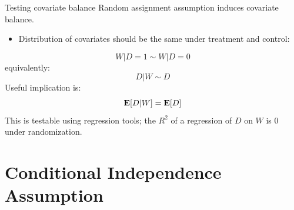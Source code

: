 \documentclass[compress, 8pt]{beamer}
\begin{document}
\begin{frame}{Testing covariate balance}
    Random assignment assumption induces covariate balance. 
    \begin{itemize}
        \item Distribution of covariates should be the same under treatment and control:
    \end{itemize}
    \begin{equation*}
        W \vert D = 1 \sim W \vert D = 0
    \end{equation*}
    equivalently:
    \begin{equation*}
        D \vert W \sim D
    \end{equation*}
    Useful implication is:
    \begin{equation*}
        \mathbf{E} [D \vert W ] = \mathbf{E} [D]
    \end{equation*}
    This is testable using regression tools; the $R^2$ of a regression of $D$ on $W$ is 0 under randomization.
\end{frame}


\section[CIA]{Conditional Independence Assumption}
\miniframesoff
\begin{frame}
    \tableofcontents[currentsection]
\end{frame}
\miniframeson


\end{document}
